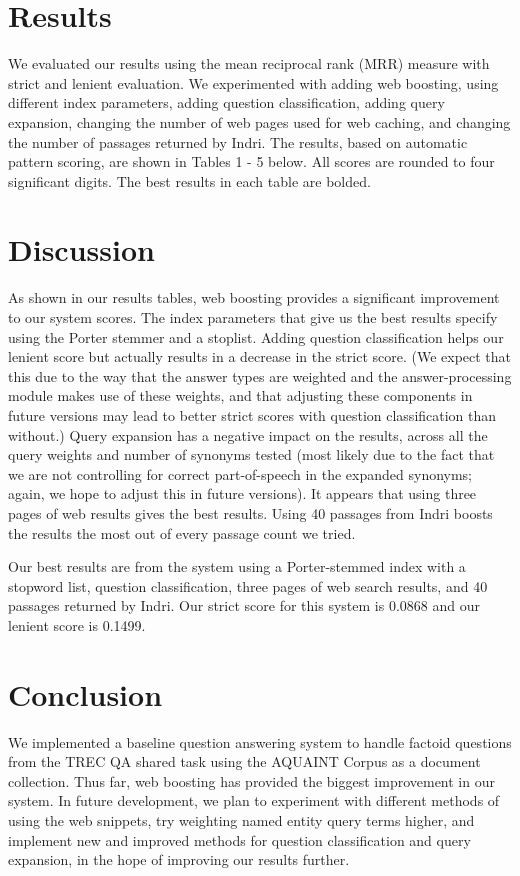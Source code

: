 \documentclass[11pt]{article}
\begin{document}
\section{Results}

We evaluated our results using the mean reciprocal rank (MRR) measure with strict and lenient evaluation. We experimented with adding web boosting, using different index parameters, adding question classification, adding query expansion, changing the number of web pages used for web caching, and changing the number of passages returned by Indri.  The results, based on automatic pattern scoring, are shown in Tables 1 - 5 below.  All scores are rounded to four significant digits.  The best results in each table are bolded.


\section{Discussion}

As shown in our results tables, web boosting provides a significant improvement to our system scores.  The index parameters that give us the best results specify using the Porter stemmer and a stoplist.  Adding question classification helps our lenient score but actually results in a decrease in the strict score. (We expect that this due to the way that the answer types are weighted and the answer-processing module makes use of these weights, and that adjusting these components in future versions may lead to better strict scores with question classification than without.)  Query expansion has a negative impact on the results, across all the query weights and number of synonyms tested (most likely due to the fact that we are not controlling for correct part-of-speech in the expanded synonyms; again, we hope to adjust this in future versions).  It appears that using three pages of web results gives the best results.  Using 40 passages from Indri boosts the results the most out of every passage count we tried.

Our best results are from the system using a Porter-stemmed index with a stopword list, question classification, three pages of web search results, and 40 passages returned by Indri.  Our strict score for this system is 0.0868 and our lenient score is 0.1499.

\section{Conclusion}

We implemented a baseline question answering system to handle factoid questions from the TREC QA shared task using the AQUAINT Corpus as a document collection. Thus far, web boosting has provided the biggest improvement in our system. In future development, we plan to experiment with different methods of using the web snippets, try weighting named entity query terms higher, and implement new and improved methods for question classification and query expansion, in the hope of improving our results further.

\nocite{*}




\end{document}
